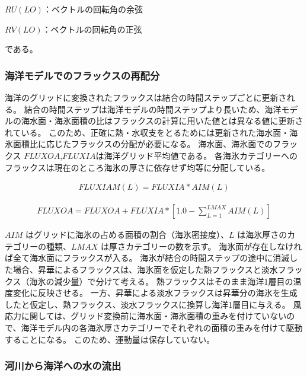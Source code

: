 \(RU(LO)\)：ベクトルの回転角の余弦

\(RV(LO)\)：ベクトルの回転角の正弦

である。

\hypertarget{ux6d77ux6d0bux30e2ux30c7ux30ebux3067ux306eux30d5ux30e9ux30c3ux30afux30b9ux306eux518dux914dux5206}{%
\subsubsection{海洋モデルでのフラックスの再配分}\label{ux6d77ux6d0bux30e2ux30c7ux30ebux3067ux306eux30d5ux30e9ux30c3ux30afux30b9ux306eux518dux914dux5206}}

海洋のグリッドに変換されたフラックスは結合の時間ステップごとに更新される。
結合の時間ステップは海洋モデルの時間ステップより長いため、海洋モデルの海水面・海氷面積の比はフラックスの計算に用いた値とは異なる値に更新されている。
このため、正確に熱・水収支をとるためには更新された海水面・海氷面積比に応じたフラックスの分配が必要になる。
海水面、海氷面でのフラックス
\(FLUXOA\),\(FLUXIA\)は海洋グリッド平均値である。
各海氷カテゴリーへのフラックスは現在のところ海氷の厚さに依存せず均等に分配している。

\begin{eqnarray} FLUXIAM(L)=FLUXIA*AIM(L)\end{eqnarray}

\begin{eqnarray} FLUXOA=FLUXOA+FLUXIA*[1.0-\sum_{L=1}^{LMAX}AIM(L)]\end{eqnarray}

\(AIM\) はグリッドに海氷の占める面積の割合（海氷密接度）、\(L\)
は海氷厚さのカテゴリーの種類、\(LMAX\) は厚さカテゴリーの数を示す。
海氷面が存在しなければ全て海水面にフラックスが入る。
海氷が結合の時間ステップの途中に消滅した場合、昇華によるフラックスは、海氷面を仮定した熱フラックスと淡水フラックス（海氷の減少量）で分けて考える。
熱フラックスはそのまま海洋1層目の温度変化に反映させる。
一方、昇華による淡水フラックスは昇華分の海氷を生成したと仮定し、熱フラックス、淡水フラックスに換算し海洋1層目に与える。
風応力に関しては、グリッド変換前に海水面・海氷面積の重みを付けていないので、海洋モデル内の各海氷厚さカテゴリーでそれぞれの面積の重みを付けて駆動することになる。
このため、運動量は保存していない。

\hypertarget{ux6cb3ux5dddux304bux3089ux6d77ux6d0bux3078ux306eux6c34ux306eux6d41ux51fa}{%
\subsubsection{河川から海洋への水の流出}\label{ux6cb3ux5dddux304bux3089ux6d77ux6d0bux3078ux306eux6c34ux306eux6d41ux51fa}}

